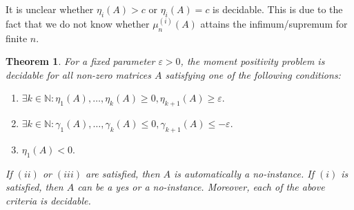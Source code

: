 \documentclass[11pt]{article}
\newtheorem{theorem}{Theorem}
\theoremstyle{definition}
\begin{document}
It is unclear whether $\eta_i(A) > c$ or $\eta_i(A) = c$ is decidable. This is due to the fact that we do not know whether $\mu_n^{(i)}(A)$ attains the infimum/supremum for finite $n$.



\begin{theorem}\label{thm:generalVersion}
For a fixed parameter $\varepsilon > 0$, the moment positivity problem is decidable for all non-zero matrices $A$ satisfying one of the following conditions:
\begin{enumerate}[label=$(\roman*)$]
	\item\label{cond:generalVers1} $\exists k \in \mathbb{N}\colon \eta_1(A), \ldots, \eta_k(A) \geqslant 0, \eta_{k+1}(A) \geqslant \varepsilon.$
	\item\label{cond:generalVers2} $\exists k \in \mathbb{N}\colon \gamma_1(A), \ldots, \gamma_k(A) \leqslant 0, \gamma_{k+1}(A) \leqslant -\varepsilon.$
	\item\label{cond:generalVers3} $\eta_1(A) < 0.$
\end{enumerate}
If $(ii)$ or $(iii)$ are satisfied, then $A$ is automatically a no-instance. If $(i)$ is satisfied, then $A$ can be a yes or a no-instance. Moreover, each of the above criteria is decidable.
\end{theorem}
\end{document}

